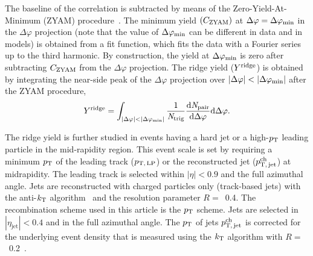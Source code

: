 The baseline of the correlation is subtracted by means of the Zero-Yield-At-Minimum (ZYAM) procedure~\cite{Ajitanand:2005jj}. The minimum yield $(C_{\rm{ZYAM}})$ at $\Delta\varphi=\Delta\varphi_{\rm{min}}$ in the $\Delta\varphi$ projection (note that the value of $\Delta\varphi_{\rm{min}}$ can be different in data and in models) is obtained from a fit function, which fits the data with a Fourier series up to the third harmonic. By construction, the yield at $\Delta\varphi_{\rm{min}}$ is zero after subtracting $C_{\rm{ZYAM}}$ from the $\Delta\varphi$ projection. The ridge yield ($Y^{\rm{ridge}}$) is obtained by integrating the near-side peak of the $\Delta\varphi$ projection over $|\Delta\varphi|<|\Delta\varphi_{\rm{min}}|$ after the ZYAM procedure,
\begin{eqnarray}
Y^{\rm{ridge}} = \int_{|\Delta \varphi| < |\Delta\varphi_{\rm{min}}| } \frac{1}{\it{N}_{\rm{trig}}} \frac{ \rm{d}\it{}N_{\rm{pair}} }{ \rm{d}\Delta\varphi }  \rm{d} \Delta\varphi .
\end{eqnarray}

The ridge yield is further studied in events having a hard jet or a high-$p_\mathrm{T}$ leading particle in the mid-rapidity region. This event scale is set by requiring a minimum $p_\mathrm{T}$ of the leading track ($p_\mathrm{T,\,LP}$) or the reconstructed jet ($p_\mathrm{T,\,jet}^\mathrm{ch}$) at midrapidity. The leading track is selected within $|\eta|<0.9$ and the full azimuthal angle. Jets are reconstructed with charged particles only (track-based jets) with the anti-$k_{\rm{T}}$ algorithm~\cite{Cacciari:2008gp,Cacciari:2011ma} and the resolution parameter $R=$~0.4. The recombination scheme used in this article is the $p_\mathrm{T}$ scheme. Jets are selected in $|\eta_\mathrm{jet}|<0.4$ and in the full azimuthal angle. The $p_\mathrm{T}$ of jets $p_\mathrm{T,\,jet}^\mathrm{ch}$ is corrected for the underlying event density that is measured using the $k_{\rm{T}}$ algorithm with $R=$~0.2~\cite{Acharya:2018eat}. 

